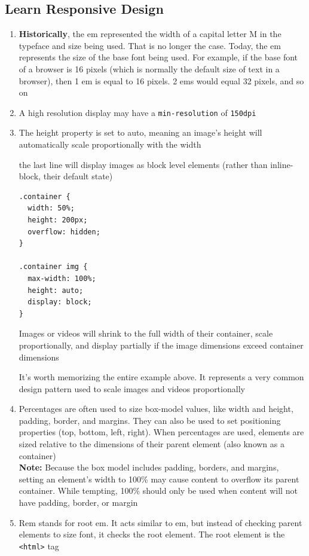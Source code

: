 \documentclass[a4paper, 12pt]{article}
\begin{document}
\subsection{Learn Responsive Design}
\begin{enumerate}
\item \textbf{Historically}, the em represented the width of a capital letter M in the typeface and size being used. That is no longer the case. Today, the em represents the size of the base font being used. For example, if the base font of a browser is 16 pixels (which is normally the default size of text in a browser), then 1 em is equal to 16 pixels. 2 ems would equal 32 pixels, and so on

\item A high resolution display may have a \verb|min-resolution| of \verb|150dpi|

\item The height property is set to auto, meaning an image's height will automatically scale proportionally with the width

the last line will display images as block level elements (rather than inline-block, their default state)
\begin{verbatim}
.container {
  width: 50%;
  height: 200px;
  overflow: hidden;
}

.container img {
  max-width: 100%;
  height: auto;
  display: block;
}
\end{verbatim}
Images or videos  will shrink to the full width of their container, scale proportionally, and display partially if the image dimensions exceed container dimensions

It's worth memorizing the entire example above. It represents a very common design pattern used to scale images and videos proportionally

\item Percentages are often used to size box-model values, like width and height, padding, border, and margins. They can also be used to set positioning properties (top, bottom, left, right). When percentages are used, elements are sized relative to the dimensions of their parent element (also known as a container) \label{position}\\
\textbf{Note:} Because the box model includes padding, borders, and margins, setting an element's width to 100\% may cause content to overflow its parent container. While tempting, 100\% should only be used when content will not have padding, border, or margin

\item Rem stands for root em. It acts similar to em, but instead of checking parent elements to size font, it checks the root element. The root element is the \verb|<html>| tag


\end{enumerate}
\end{document}
